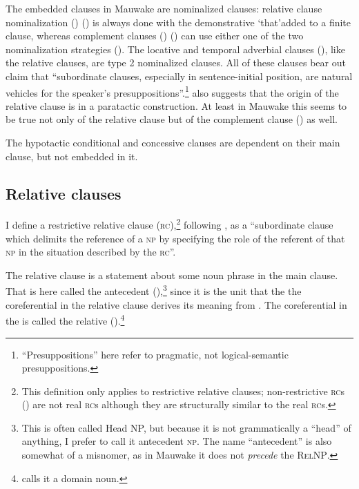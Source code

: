 The embedded clauses in Mauwake are nominalized clauses: relative clause nominalization () () is always done with the demonstrative \textstyleStyleVernacularWordsItalic `that'added to a finite clause, whereas complement clauses () () can use either one of the two nominalization strategies (). The locative and temporal adverbial clauses (), like the relative clauses, are type 2 nominalized clauses. All of these clauses bear out  claim that ``subordinate clauses, especially in sentence-initial position, are natural vehicles for the speaker's presuppositions''.\footnote{``Presuppositions'' here refer to pragmatic, not logical-semantic presuppositions.}  \citet[230]{Reesink1983b} also suggests that the origin of the relative clause is in a paratactic construction. At least in Mauwake this seems to be true not only of the relative clause but of the complement clause () as well. 

The hypotactic conditional and concessive clauses are dependent on their main clause, but not embedded in it. 

\subsection{Relative clauses} 

I define a restrictive relative clause (\textsc{rc}),\footnote{This definition only applies to restrictive relative clauses; non-restrictive \textsc{rc}s () are not real \textsc{rc}s although they are structurally similar to the real \textsc{rc}s.} following \citet[206]{Andrews2007b}, as a ``subordinate clause which delimits the reference of a \textsc{np} by specifying the role of the referent of that \textsc{np} in the situation described by the \textsc{rc}''. 

The relative clause is a statement about some noun phrase in the main clause. That  is here called the antecedent  (),\footnote{This is often called Head NP, but because it is not grammatically a ``head'' of anything, I prefer to call it antecedent \textsc{np}. The name ``antecedent'' is also somewhat of a misnomer, as in Mauwake it does not \textit{precede} the \textsc{RelNP}.}  since it is the unit that the the coreferential  in the relative clause derives its meaning from \citep[20]{Crystal1997}. The coreferential  in the  is called the relative  ().\footnote{\citet[142]{Keenan1985} calls it a domain noun.}

